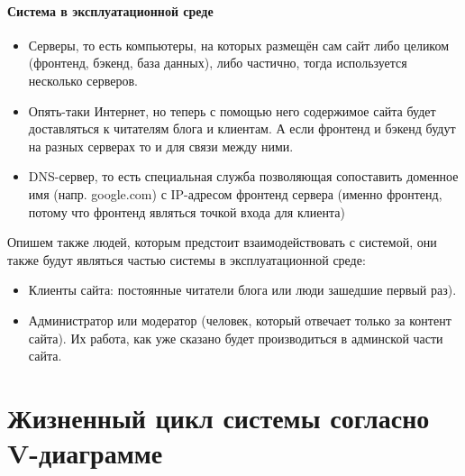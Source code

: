 \documentclass[bibliography=totocnumbered]{scrartcl}
\begin{document}
\paragraph{Система в эксплуатационной среде}

\begin{itemize}
    \item Серверы, то есть компьютеры, на которых размещён сам сайт либо целиком (фронтенд, бэкенд, база данных), либо частично, тогда используется несколько серверов.

    \item Опять-таки Интернет, но теперь с помощью него содержимое сайта будет доставляться к читателям блога и клиентам. А если фронтенд и бэкенд будут на разных серверах то и для связи между ними.

    \item DNS-сервер, то есть специальная служба позволяющая сопоставить доменное имя (напр. google.com) с IP-адресом фронтенд сервера (именно фронтенд, потому что фронтенд являться точкой входа для клиента)
    
\end{itemize}

Опишем также людей, которым предстоит взаимодействовать с системой, они также будут являться частью системы в эксплуатационной среде:
\begin{itemize}
    \item Клиенты сайта: постоянные читатели блога или люди зашедшие первый раз).
    \item Администратор или модератор (человек, который отвечает только за контент сайта). Их работа, как уже сказано будет производиться в админской части сайта.
\end{itemize}

\section{Жизненный цикл системы согласно V-диаграмме}
\end{document}
